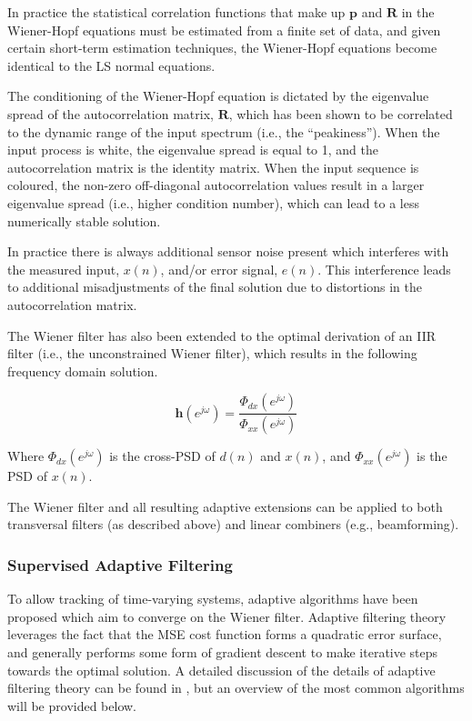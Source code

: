 In practice the statistical correlation functions that make up $\boldsymbol{p}$ and $\boldsymbol{R}$ in the Wiener-Hopf equations must be estimated from a finite set of data, and given certain short-term estimation techniques, the Wiener-Hopf equations become identical to the LS normal equations.

The conditioning of the Wiener-Hopf equation is dictated by the eigenvalue spread of the autocorrelation matrix, $\boldsymbol{R}$, which has been shown to be correlated to the dynamic range of the input spectrum (i.e., the “peakiness”). When the input process is white, the eigenvalue spread is equal to 1, and the autocorrelation matrix is the identity matrix. When the input sequence is coloured, the non-zero off-diagonal autocorrelation values result in a larger eigenvalue spread (i.e., higher condition number), which can lead to a less numerically stable solution.

In practice there is always additional sensor noise present which interferes with the measured input, $x(n)$, and/or error signal, $e(n)$. This interference leads to additional misadjustments of the final solution due to distortions in the autocorrelation matrix.

The Wiener filter has also been extended to the optimal derivation of an IIR filter (i.e., the unconstrained Wiener filter), which results in the following frequency domain solution.

\begin{equation}
	\boldsymbol{h}(e^{j\omega}) = \frac{\Phi_{dx}(e^{j\omega})}{\Phi_{xx}(e^{j\omega})}
\end{equation}

\noindent
Where $\Phi_{dx}(e^{j\omega})$ is the cross-PSD of $d(n)$ and $x(n)$, and $\Phi_{xx}(e^{j\omega})$ is the PSD of $x(n)$.

The Wiener filter and all resulting adaptive extensions can be applied to both transversal filters (as described above) and linear combiners (e.g., beamforming). 

\subsubsection{Supervised Adaptive Filtering}

To allow tracking of time-varying systems, adaptive algorithms have been proposed which aim to converge on the Wiener filter. Adaptive filtering theory leverages the fact that the MSE cost function forms a quadratic error surface, and generally performs some form of gradient descent to make iterative steps towards the optimal solution. A detailed discussion of the details of adaptive filtering theory can be found in \cite{farhang2013adaptive}, but an overview of the most common algorithms will be provided below.


